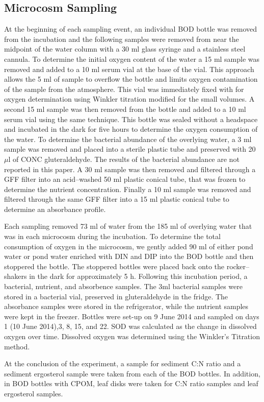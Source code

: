 \subsection{Microcosm Sampling}
At the beginning of each sampling event, an individual BOD bottle was removed from the incubation and the following samples were removed from near the midpoint of the water column with a 30 ml glass syringe and a stainless steel cannula. To determine the initial oxygen content of the water a 15 ml sample was removed and added to a 10 ml serum vial at the base of the vial. This approach allows the 5 ml of sample to overflow the bottle and limits oxygen contamination of the sample from the atmosphere. This vial was immediately fixed with for oxygen determination using Winkler titration \cite{CARPENTER_1965} modified for the small volumes. A second 15 ml sample was then removed from the bottle and added to a 10 ml serum vial using the same technique. This bottle was sealed without a headspace and incubated in the dark for five hours to determine the oxygen consumption of the water. To determine the bacterial abundance of the overlying water, a 3 ml sample was removed and placed into a sterile plastic tube and preserved with 20 $\mu$l of CONC gluteraldehyde. The results of the bacterial abundance are not reported in this paper. A 30 ml sample was then removed and filtered through a GFF filter into an acid--washed 50 ml plastic conical tube, that was frozen to determine the nutrient concentration. Finally a 10 ml sample was removed and filtered through the same GFF filter into a 15 ml plastic conical tube to determine an absorbance profile. 

Each sampling removed 73 ml of water from the 185 ml of overlying water that was in each microcosm during the incubation. To determine the total consumption of oxygen in the microcosm, we gently added 90 ml of either pond water or pond water enriched with DIN and DIP into the BOD bottle and then stoppered the bottle. The stoppered bottles were placed back onto the rocker--shakers in the dark for approximately 5 h. Following this incubation period, a  bacterial, nutrient, and absorbence samples. The 3ml  bacterial samples were stored in a bacterial vial, preserved in gluteraldehyde in the fridge. The absorbance samples were stored in the refrigerator, while the nutrient samples were kept in the freezer. Bottles were set-up on 9 June 2014 and sampled on days 1 (10 June 2014),3, 8, 15, and 22. SOD was calculated as the change in dissolved oxygen over time. Dissolved oxygen was determined using the Winkler's Titration method. 

At the conclusion of the experiment, a sample for sediment C:N ratio and a sediment ergosterol sample were taken from each of the BOD bottles. In addition, in BOD bottles with CPOM, leaf disks were taken for C:N ratio samples and leaf ergosterol samples. 
